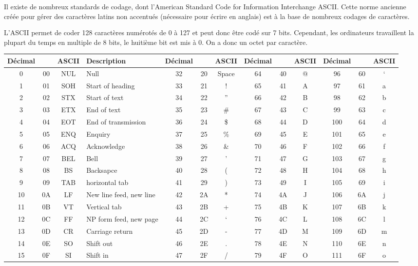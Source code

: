 \documentclass[10pt,fleqn]{article} %
\begin{document}
 
Il existe de nombreux standards de codage, dont l'American Standard Code for Information Interchange   ASCII. Cette norme ancienne créée pour gérer des caractères latins non accentués (nécessaire pour écrire en anglais) est à la base de nombreux codages de caractères.

L'ASCII permet de coder 128 caractères numérotés de 0 à 127 et peut donc être codé sur 7 bits. Cependant, les ordinateurs travaillent la plupart du temps en multiple de 8 bits, le huitième bit est mis à 0. On a donc un octet par caractère.


\begin{center}
\footnotesize{\begin{tabular}{|ccc l||ccc||ccc||ccc|}
\hline 
\textbf{Décimal} & &\textbf{ASCII} & \textbf{Description} & \textbf{Décimal} && \textbf{ASCII} & \textbf{Décimal} && \textbf{ASCII} & \textbf{Décimal} && 
\textbf{ASCII}\\
\hline\hline
0 &00&NUL & Null 					&32&20&Space &64 &40& @	& 96  &60& ` \\
1 &01&SOH & Start of heading   		&33&21&! 	&65&41& A 	& 97 &61& a \\
2 &02&STX & Start of text       		&34&22&'' 	&66&42& B 	& 98 &62& b \\
3 &03&ETX & End of text       		&35&23&\# 	&67&43& C 	& 99 &63& c \\
4 &04&EOT & End of transmission 	&36&24&\$ 	&68&44& D 	& 100 &64& d \\
5 &05&ENQ & Enquiry 				&37&25&\% 	&69&45& E 	& 101&65& e \\
6 &06&ACQ & Acknowledge 			&38&26&\& 	&70&46& F 	& 102 &66& f \\
7 &07&BEL& Bell 					&39&27&' 	&71&47& G 	& 103 &67& g \\
8 &08&BS&Backsapce 				&40&28&(	&72&48& H 	& 104 &68& h \\
9 &09&TAB& horizontal tab 			&41&29&)	&73&49& I 	& 105 &69& i \\
10&0A&LF&New line feed, new line	&42&2A&*	&74&4A& J 	& 106 &6A& j \\
11&0B&VT& Vertical tab  			&43&2B&+	&75&4B& K 	& 107 &6B& k \\
12&0C&FF& NP form feed, new page 	&44&2C&`	&76&4C& L 	& 108 &6C& l \\  
13&0D&CR& Carriage return 			&45&2D&- 	&77&4D& M 	& 109 &6D& m \\
14&0E&SO& Shift out 				&46&2E&. 	&78&4E& N 	& 110 &6E& n \\
15&0F&SI& Shift in 				&47&2F&/ 	&79&4F& O 	& 111 &6F& o \\

\end{tabular}}
\end{center}
\end{document}
